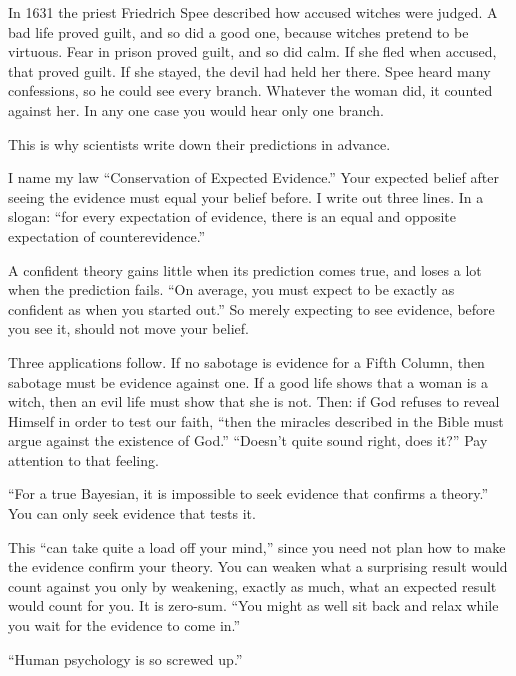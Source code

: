 
In 1631 the priest Friedrich Spee described how accused witches were judged. A bad life proved guilt, and so did a good one, because witches pretend to be virtuous. Fear in prison proved guilt, and so did calm. If she fled when accused, that proved guilt. If she stayed, the devil had held her there. Spee heard many confessions, so he could see every branch. Whatever the woman did, it counted against her. In any one case you would hear only one branch. 

This is why scientists write down their predictions in advance. 

I name my law ``Conservation of Expected Evidence.'' Your expected belief after seeing the evidence must equal your belief before. I write out three lines.  In a slogan: ``for every expectation of evidence, there is an equal and opposite expectation of counterevidence.''

A confident theory gains little when its prediction comes true, and loses a lot when the prediction fails. ``On average, you must expect to be exactly as confident as when you started out.'' So merely expecting to see evidence, before you see it, should not move your belief. 

Three applications follow. If no sabotage is evidence for a Fifth Column, then sabotage must be evidence against one. If a good life shows that a woman is a witch, then an evil life must show that she is not. Then: if God refuses to reveal Himself in order to test our faith, ``then the miracles described in the Bible must argue against the existence of God.'' ``Doesn't quite sound right, does it?'' Pay attention to that feeling. 

``For a true Bayesian, it is impossible to seek evidence that confirms a theory.'' You can only seek evidence that tests it. 

This ``can take quite a load off your mind,'' since you need not plan how to make the evidence confirm your theory. You can weaken what a surprising result would count against you only by weakening, exactly as much, what an expected result would count for you. It is zero-sum. ``You might as well sit back and relax while you wait for the evidence to come in.'' 

``Human psychology is so screwed up.''
